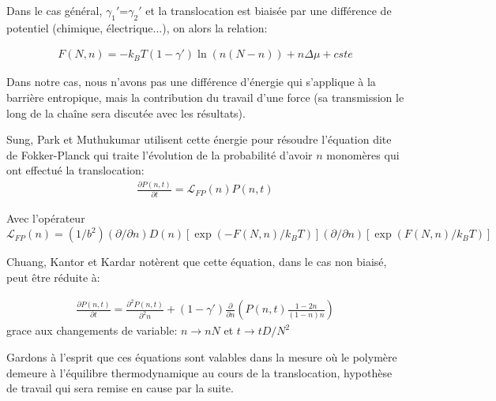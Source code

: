 Dans le cas général, $\gamma_1'$=$\gamma_2'$ et la translocation est biaisée par une différence de potentiel (chimique, électrique...), on alors la relation:

\begin{eqnarray}
F(N,n)= -k_BT(1-\gamma')\ln \left(n(N-n)\right) + n \Delta \mu +cste
\label{energbargen}
\end{eqnarray}

Dans notre cas, nous n'avons pas une différence d'énergie qui s'applique à la barrière entropique, mais la contribution du travail d'une force (sa transmission le long de la chaîne sera discutée avec les résultats).

Sung, Park et Muthukumar \cite{Sung1996,Muthukumar1999} utilisent cette énergie pour résoudre l'équation dite de Fokker-Planck qui traite l'évolution de la probabilité d'avoir $n$ monomères qui ont effectué la translocation:
\begin{eqnarray}
\frac{\partial P(n,t)}{\partial t} =   \mathcal{L}_{FP}(n) P(n,t)
\label{equfokkerplank1}
\end{eqnarray}

Avec l'opérateur $\mathcal{L}_{FP}(n)= (1/b^2)(\partial/\partial n) D(n)[\exp(-F(N,n)/k_BT)](\partial/\partial n)[\exp(F(N,n)/k_BT)]$

Chuang, Kantor et Kardar \cite{Chuang2001} notèrent que cette équation, dans le cas non biaisé, peut être réduite à:

\begin{eqnarray}
\frac{\partial P(n,t)}{\partial t} =   \frac{\partial ^2 P(n,t)}{\partial ^2 n} +(1-\gamma') \frac{\partial  }{\partial  n}\left(P(n,t)\frac{1-2n}{(1-n)n}\right)
\label{equfokkerplank2}
\end{eqnarray}
grace aux changements de variable:
$n \rightarrow nN$ et $t \rightarrow tD/N^2$


Gardons à l'esprit que ces équations sont valables dans la mesure où le polymère demeure à l'équilibre thermodynamique au cours de la translocation, hypothèse de travail qui sera remise en cause par la suite.




